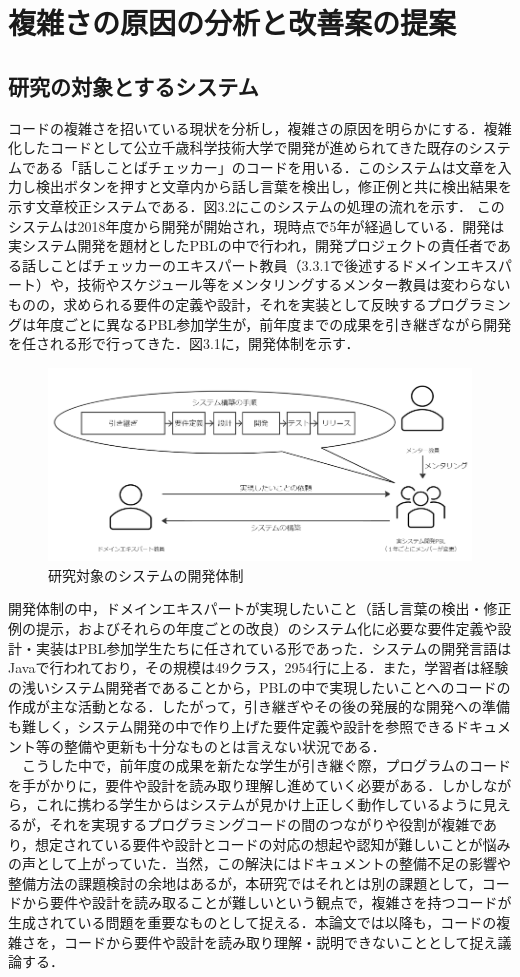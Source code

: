 \documentclass[12pt, a4paper]{jreport}
\begin{document}
\chapter{複雑さの原因の分析と改善案の提案}
\section{研究の対象とするシステム}
コードの複雑さを招いている現状を分析し，複雑さの原因を明らかにする．複雑化したコードとして公立千歳科学技術大学で開発が進められてきた既存のシステムである「話しことばチェッカー」のコードを用いる．このシステムは文章を入力し検出ボタンを押すと文章内から話し言葉を検出し，修正例と共に検出結果を示す文章校正システムである．図3.2にこのシステムの処理の流れを示す．
このシステムは2018年度から開発が開始され，現時点で5年が経過している．開発は実システム開発を題材としたPBLの中で行われ，開発プロジェクトの責任者である話しことばチェッカーのエキスパート教員（3.3.1で後述するドメインエキスパート）や，技術やスケジュール等をメンタリングするメンター教員は変わらないものの，求められる要件の定義や設計，それを実装として反映するプログラミングは年度ごとに異なるPBL参加学生が，前年度までの成果を引き継ぎながら開発を任される形で行ってきた．図3.1に，開発体制を示す．
\begin{figure}[H]
\centering
\includegraphics[width=0.75\linewidth]{image/taisyou1.1.png}
\caption{研究対象のシステムの開発体制}
\label{fig:enter-label}
\end{figure}
開発体制の中，ドメインエキスパートが実現したいこと（話し言葉の検出・修正例の提示，およびそれらの年度ごとの改良）のシステム化に必要な要件定義や設計・実装はPBL参加学生たちに任されている形であった．システムの開発言語はJavaで行われており，その規模は49クラス，2954行に上る．また，学習者は経験の浅いシステム開発者であることから，PBLの中で実現したいことへのコードの作成が主な活動となる．したがって，引き継ぎやその後の発展的な開発への準備も難しく，システム開発の中で作り上げた要件定義や設計を参照できるドキュメント等の整備や更新も十分なものとは言えない状況である．
\\　こうした中で，前年度の成果を新たな学生が引き継ぐ際，プログラムのコードを手がかりに，要件や設計を読み取り理解し進めていく必要がある．しかしながら，これに携わる学生からはシステムが見かけ上正しく動作しているように見えるが，それを実現するプログラミングコードの間のつながりや役割が複雑であり，想定されている要件や設計とコードの対応の想起や認知が難しいことが悩みの声として上がっていた．当然，この解決にはドキュメントの整備不足の影響や整備方法の課題検討の余地はあるが，本研究ではそれとは別の課題として，コードから要件や設計を読み取ることが難しいという観点で，複雑さを持つコードが生成されている問題を重要なものとして捉える．本論文では以降も，コードの複雑さを，コードから要件や設計を読み取り理解・説明できないこととして捉え議論する．
\end{document}
